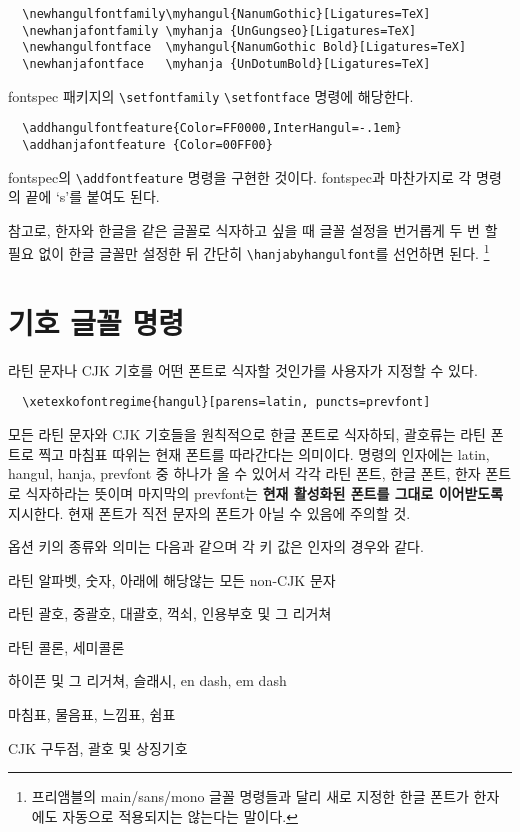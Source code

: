 \documentclass[a4paper]{article}
\def\cs#1{\texttt{\textbackslash #1}}
\def\hemph#1{\textsf{\bfseries #1}}
\def\keyword#1{\leavevmode\marginpar{\hfuzz\maxdimen\footnotesize\cs{#1}}}
\begin{document}
\begin{verbatim}
  \newhangulfontfamily\myhangul{NanumGothic}[Ligatures=TeX]
  \newhanjafontfamily \myhanja {UnGungseo}[Ligatures=TeX]
  \newhangulfontface  \myhangul{NanumGothic Bold}[Ligatures=TeX]
  \newhanjafontface   \myhanja {UnDotumBold}[Ligatures=TeX]
\end{verbatim}
fontspec 패키지의 \cs{setfontfamily} \cs{setfontface} 명령에 해당한다.

\begin{verbatim}
  \addhangulfontfeature{Color=FF0000,InterHangul=-.1em}
  \addhanjafontfeature {Color=00FF00}
\end{verbatim}
fontspec의 \cs{addfontfeature} 명령을 구현한 것이다.
fontspec과 마찬가지로 각 명령의 끝에 `s'를 붙여도 된다.

참고로, 한자와 한글을 같은 글꼴로 식자하고 싶을 때 글꼴 설정을
번거롭게 두 번 할 필요 없이 한글 글꼴만 설정한 뒤 간단히
\keyword{hanjabyhangulfont}%
\cs{hanjabyhangulfont}를 선언하면 된다.%
\footnote{프리앰블의 main/sans/mono 글꼴 명령들과 달리 새로 지정한 한글 폰트가
  한자에도 자동으로 적용되지는 않는다는 말이다.}


\section{기호 글꼴 명령}\label{sec:symbolfont}
라틴 문자나 CJK 기호를 어떤 폰트로 식자할 것인가를 사용자가 지정할 수 있다.
\begin{verbatim}
  \xetexkofontregime{hangul}[parens=latin, puncts=prevfont]
\end{verbatim}
모든 라틴 문자와 CJK 기호들을 원칙적으로 한글 폰트로 식자하되,
괄호류는 라틴 폰트로 찍고 마침표 따위는 현재 폰트를 따라간다는 의미이다.
명령의 인자에는 latin, hangul, hanja, prevfont 중 하나가 올 수 있어서
각각 라틴 폰트, 한글 폰트, 한자 폰트로 식자하라는 뜻이며
마지막의 prevfont는 \hemph{현재 활성화된 폰트를 그대로 이어받도록} 지시한다.
현재 폰트가 직전 문자의 폰트가 아닐 수 있음에 주의할 것.

옵션 키의 종류와 의미는 다음과 같으며 각 키 값은 인자의 경우와 같다.
\begin{description}\itemsep0pt\hangulparens
\item[alphs] 라틴 알파벳, 숫자, 아래에 해당않는 모든 non-CJK 문자
\item[parens] 라틴 괄호, 중괄호, 대괄호, 꺽쇠, 인용부호 및 그 리거쳐
\item[colons] 라틴 콜론, 세미콜론
\item[hyphens] 하이픈 및 그  리거쳐, 슬래시, en dash, em dash
\item[puncts] 마침표, 물음표, 느낌표, 쉼표
\item[cjksymbols] CJK 구두점, 괄호 및 상징기호
\end{description}
\end{document}
